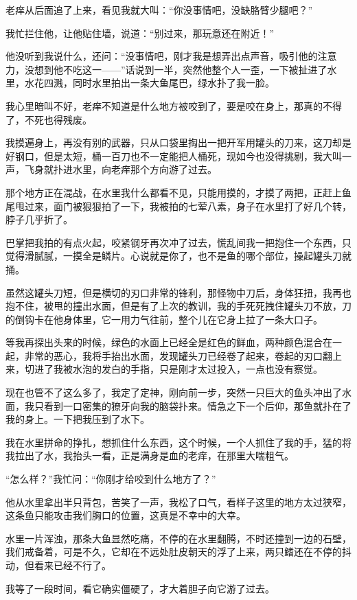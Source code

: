 老痒从后面追了上来，看见我就大叫：“你没事情吧，没缺胳臂少腿吧？”

我忙拦住他，让他贴住墙，说道：“别过来，那玩意还在附近！”

他没听到我说什么，还问：“没事情吧，刚才我是想弄出点声音，吸引他的注意力，没想到他不吃这一——”话说到一半，突然他整个人一歪，一下被扯进了水里，水花四溅，同时水里拍出一条大鱼尾巴，绿水扑了我一脸。

我心里暗叫不好，老痒不知道是什么地方被咬到了，要是咬在身上，那真的不得了，不死也得残废。

我摸遍身上，再没有别的武器，只从口袋里掏出一把开军用罐头的刀来，这刀却是好钢口，但是太短，桶一百刀也不一定能把人桶死，现如今也没得挑剔，我大叫一声，飞身就扑进水里，向老痒那个方向游了过去。

那个地方正在混战，在水里我什么都看不见，只能用摸的，才摸了两把，正赶上鱼尾甩过来，面门被狠狠拍了一下，我被拍的七荤八素，身子在水里打了好几个转，脖子几乎折了。

巴掌把我拍的有点火起，咬紧钢牙再次冲了过去，慌乱间我一把抱住一个东西，只觉得滑腻腻，一摸全是鳞片。心说就是你了，也不是鱼的哪个部位，操起罐头刀就捅。

虽然这罐头刀短，但是横切的刃口非常的锋利，那怪物中刀后，身体狂扭，我再也抱不住，被甩的撞出水面，但是有了上次的教训，我的手死死拽住罐头刀不放，刀的倒钩卡在他身体里，它一用力气往前，整个儿在它身上拉了一条大口子。

等我再探出头来的时候，绿色的水面上已经全是红色的鲜血，两种颜色混合在一起，非常的恶心，我将手抬出水面，发现罐头刀已经卷了起来，卷起的刃口翻上来，切进了我被水泡的发白的手指，只是刚才太过投入，一点也没有察觉。

现在也管不了这么多了，我定了定神，刚向前一步，突然一只巨大的鱼头冲出了水面，我只看到一口密集的獠牙向我的脑袋扑来。情急之下一个后仰，那鱼就扑在了我的身上。一下把我压到了水下。

我在水里拼命的挣扎，想抓住什么东西，这个时候，一个人抓住了我的手，猛的将我拉出了水，我抬头一看，正是满身是血的老痒，在那里大喘粗气。

“怎么样？”我忙问：“你刚才给咬到什么地方了？”

他从水里拿出半只背包，苦笑了一声，我松了口气，看样子这里的地方太过狭窄，这条鱼只能攻击我们胸口的位置，这真是不幸中的大幸。

水里一片浑浊，那条大鱼显然吃痛，不停的在水里翻腾，不时还撞到一边的石壁，我们戒备着，可是不久，它却在不远处肚皮朝天的浮了上来，两只鳍还在不停的抖动，但看来已经不行了。

我等了一段时间，看它确实僵硬了，才大着胆子向它游了过去。

